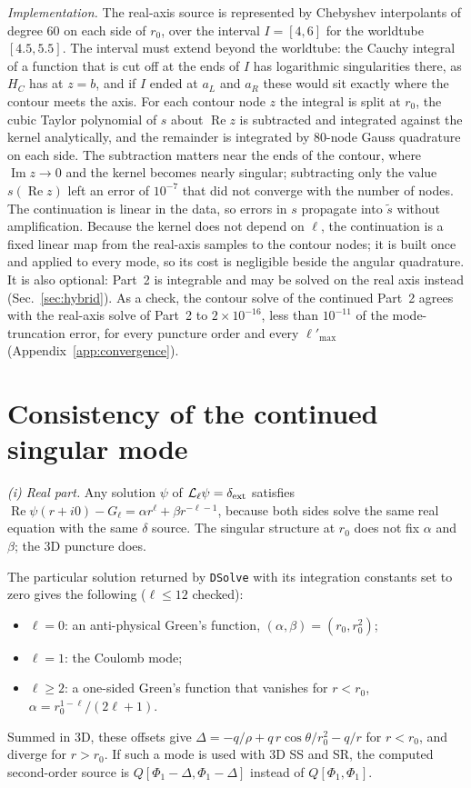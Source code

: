 \documentclass[aps,prd,twocolumn,superscriptaddress,nofootinbib,floatfix]{revtex4-2}
\renewcommand{\Re}{\operatorname{Re}}
\renewcommand{\Im}{\operatorname{Im}}
\newcommand{\dext}{\delta_{\rm ext}}
\newcommand{\Lop}{\mathcal{L}_\ell}
\begin{document}
\emph{Implementation.}
The real-axis source is represented by Chebyshev interpolants of degree 60 on each side of $r_0$, over the interval $I=[4,6]$ for the worldtube $[4.5,5.5]$.
The interval must extend beyond the worldtube: the Cauchy integral of a function that is cut off at the ends of $I$ has logarithmic singularities there, as $H_C$ has at $z=b$, and if $I$ ended at $a_L$ and $a_R$ these would sit exactly where the contour meets the axis.
For each contour node $z$ the integral is split at $r_0$, the cubic Taylor polynomial of $s$ about $\Re z$ is subtracted and integrated against the kernel analytically, and the remainder is integrated by 80-node Gauss quadrature on each side.
The subtraction matters near the ends of the contour, where $\Im z\to0$ and the kernel becomes nearly singular; subtracting only the value $s(\Re z)$ left an error of $10^{-7}$ that did not converge with the number of nodes.
The continuation is linear in the data, so errors in $s$ propagate into $\tilde s$ without amplification.
Because the kernel does not depend on $\ell$, the continuation is a fixed linear map from the real-axis samples to the contour nodes; it is built once and applied to every mode, so its cost is negligible beside the angular quadrature.
It is also optional: Part~2 is integrable and may be solved on the real axis instead (Sec.~\ref{sec:hybrid}).
As a check, the contour solve of the continued Part~2 agrees with the real-axis solve of Part~2 to $2\times10^{-16}$, less than $10^{-11}$ of the mode-truncation error, for every puncture order and every $\ell'_{\max}$ (Appendix~\ref{app:convergence}).

\section{Consistency of the continued singular mode}\label{app:consistency}
\emph{(i) Real part.}
Any solution $\psi$ of $\Lop\psi=\dext$ satisfies $\Re\psi(r+i0)-G_\ell=\alpha r^\ell+\beta r^{-\ell-1}$, because both sides solve the same real equation with the same $\delta$ source.
The singular structure at $r_0$ does not fix $\alpha$ and $\beta$; the 3D puncture does.

The particular solution returned by \texttt{DSolve} with its integration constants set to zero gives the following ($\ell\le12$ checked):
\begin{itemize}
\item $\ell=0$: an anti-physical Green's function, $(\alpha,\beta)=(r_0,r_0^2)$;
\item $\ell=1$: the Coulomb mode;
\item $\ell\ge2$: a one-sided Green's function that vanishes for $r<r_0$, $\alpha=r_0^{1-\ell}/(2\ell+1)$.
\end{itemize}
Summed in 3D, these offsets give $\Delta=-q/\rho+q\,r\cos\theta/r_0^2-q/r$ for $r<r_0$, and diverge for $r>r_0$.
If such a mode is used with 3D SS and SR, the computed second-order source is $Q[\Phi_1-\Delta,\Phi_1-\Delta]$ instead of $Q[\Phi_1,\Phi_1]$.
\end{document}
